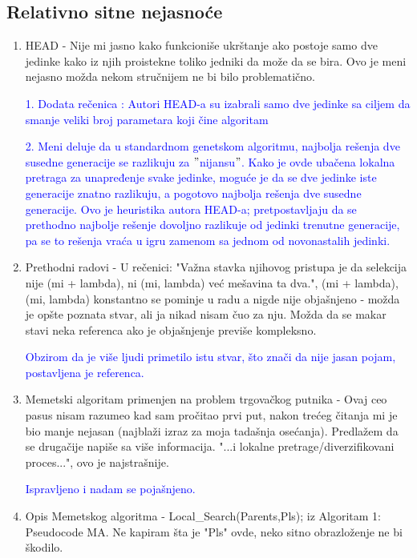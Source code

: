 \documentclass[a4paper]{report}
\newcommand{\odgovor}[1]{\textcolor{blue}{#1}}
\begin{document}
\subsection{Relativno sitne nejasnoće}
\begin{enumerate}
  \item HEAD - Nije mi jasno kako funkcioniše ukrštanje ako postoje samo dve jedinke kako iz njih proistekne toliko jedniki da može da se bira. Ovo je meni nejasno možda nekom stručnijem ne bi bilo problematično.
  
  \odgovor{1. Dodata rečenica : Autori HEAD-a su izabrali samo dve jedinke sa ciljem da smanje veliki broj parametara koji čine algoritam}
  
  \odgovor{2. Meni deluje da u standardnom genetskom algoritmu, najbolja rešenja dve susedne generacije se razlikuju za $"$nijansu$"$. Kako je ovde ubačena lokalna pretraga za unapređenje svake jedinke, moguće je da se dve jedinke iste generacije znatno razlikuju, a pogotovo najbolja rešenja dve susedne generacije. Ovo je heuristika autora HEAD-a; pretpostavljaju da se prethodno najbolje rešenje dovoljno razlikuje od jedinki trenutne generacije, pa se to rešenja vraća u igru zamenom sa jednom od novonastalih jedinki.}  
  
  \item Prethodni radovi - U rečenici: "Važna stavka njihovog pristupa je da selekcija nije (mi + lambda), ni (mi, lambda) već mešavina ta dva.", (mi + lambda), (mi, lambda) konstantno se pominje u radu a nigde nije objašnjeno - možda je opšte poznata stvar, ali ja nikad nisam čuo za nju. Možda da se makar stavi neka referenca ako je objašnjenje previše kompleksno. 
  
  \odgovor{ Obzirom da je više ljudi primetilo istu stvar, što znači da nije jasan pojam, postavljena je referenca. }
  
  \item Memetski algoritam primenjen na problem trgovačkog putnika - Ovaj ceo pasus nisam razumeo kad sam pročitao prvi put, nakon trećeg čitanja mi je bio manje nejasan (najblaži izraz za moja tadašnja osećanja). Predlažem da se drugačije napiše sa više informacija. "...i lokalne pretrage/diverzifikovani proces...", ovo je najstrašnije. 
  
   \odgovor{ Ispravljeno i nadam se pojašnjeno. }
   
   \item Opis Memetskog algoritma - Local\_Search(Parents,Pls); iz Algoritam 1: Pseudocode MA. Ne kapiram šta je "Pls" ovde, neko sitno obrazloženje ne bi škodilo. 
   

\end{enumerate}
\end{document}
